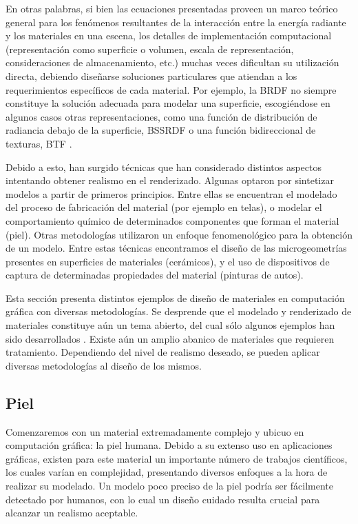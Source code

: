 En otras palabras, si bien las ecuaciones presentadas proveen un marco teórico general para los fenómenos resultantes de la interacción entre la energía radiante y los materiales en una escena, los detalles de implementación computacional (representación como superficie o volumen, escala de representación, consideraciones de almacenamiento, etc.) muchas veces dificultan su utilización directa, debiendo diseñarse soluciones particulares que atiendan a los requerimientos específicos de cada material.
Por ejemplo, la BRDF no siempre constituye la solución adecuada para modelar una superficie, escogiéndose en algunos casos otras representaciones, como una función de distribución de radiancia debajo de la superficie, \acrshort{BSSRDF} \cite{Donner2006} o una función bidireccional de texturas, \acrshort{BTF} \cite{Tong2002}.

Debido a esto, han surgido técnicas que han considerado distintos aspectos intentando obtener realismo en el renderizado.
Algunas optaron por sintetizar modelos a partir de primeros principios. 
Entre ellas se encuentran el modelado del proceso de fabricación del material (por ejemplo en telas), o modelar el comportamiento químico de determinados componentes que forman el material (piel).
Otras metodologías utilizaron un enfoque fenomenológico para la obtención de un modelo.
Entre estas técnicas encontramos el diseño de las microgeometrías presentes en superficies de materiales (cerámicos), y el uso de dispositivos de captura de determinadas propiedades del material (pinturas de autos). 


Esta sección presenta distintos ejemplos de diseño de materiales en computación gráfica con diversas metodologías.
Se desprende que el modelado y renderizado de materiales constituye aún un tema abierto, del cual sólo algunos ejemplos han sido desarrollados \cite{Dorsey2007}.
Existe aún un amplio abanico de materiales que requieren tratamiento.
Dependiendo del nivel de realismo deseado, se pueden aplicar diversas metodologías al diseño de los mismos.


\subsection{Piel}
Comenzaremos con un material extremadamente complejo y ubicuo en computación gráfica: la piel humana.
Debido a su extenso uso en aplicaciones gráficas, existen para este material un importante número de trabajos científicos, los cuales varían en complejidad, presentando diversos enfoques a la hora de realizar su modelado.
Un modelo poco preciso de la piel podría ser fácilmente detectado por humanos, con lo cual un diseño cuidado resulta crucial para alcanzar un realismo aceptable.


